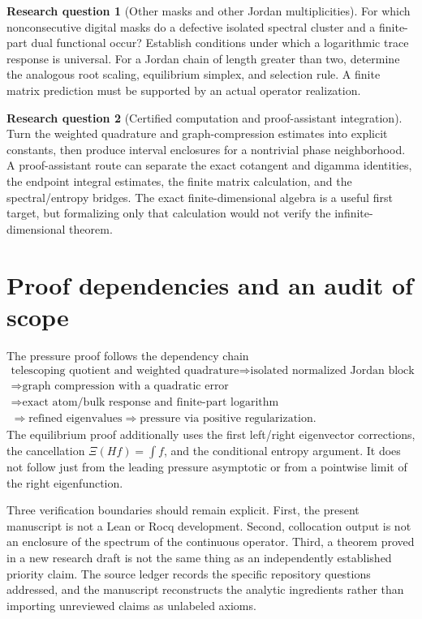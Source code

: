 \documentclass[11pt,a4paper]{article}
\numberwithin{equation}{section}
\theoremstyle{definition}
\newtheorem{question}{Research question}
\theoremstyle{remark}
\begin{document}
\begin{question}[Other masks and other Jordan multiplicities]
For which nonconsecutive digital masks do a defective isolated
spectral cluster and a finite-part dual functional occur? Establish
conditions under which a logarithmic trace response is universal.
For a Jordan chain of length greater than two, determine the analogous
root scaling, equilibrium simplex, and selection rule. A finite matrix
prediction must be supported by an actual operator realization.
\end{question}

\begin{question}[Certified computation and proof-assistant integration]
Turn the weighted quadrature and graph-compression estimates into
explicit constants, then produce interval enclosures for a nontrivial
phase neighborhood. A proof-assistant route can separate the exact
cotangent and digamma identities, the endpoint integral estimates,
the finite matrix calculation, and the spectral/entropy bridges.
The exact finite-dimensional algebra is a useful first target, but
formalizing only that calculation would not verify the infinite-dimensional
theorem.
\end{question}

\appendix
\section{Proof dependencies and an audit of scope}
\label{app:audit}
The pressure proof follows the dependency chain
\[
\begin{gathered}
\text{telescoping quotient and weighted quadrature}
\Longrightarrow\text{isolated normalized Jordan block}\\
\Longrightarrow\text{graph compression with a quadratic error}\\
\Longrightarrow\text{exact atom/bulk response and finite-part logarithm}\\
\Longrightarrow\text{refined eigenvalues}
\Longrightarrow\text{pressure via positive regularization}.
\end{gathered}
\]
The equilibrium proof additionally uses the first left/right eigenvector
corrections, the cancellation $\Xi(Hf)=\int f$, and the conditional
entropy argument. It does not follow just from the leading pressure
asymptotic or from a pointwise limit of the right eigenfunction.

Three verification boundaries should remain explicit. First, the present
manuscript is not a Lean or Rocq development. Second, collocation output
is not an enclosure of the spectrum of the continuous operator. Third,
a theorem proved in a new research draft is not the same thing as an
independently established priority claim. The source ledger records the
specific repository questions addressed, and the manuscript reconstructs
the analytic ingredients rather than importing unreviewed claims as
unlabeled axioms.
\end{document}
